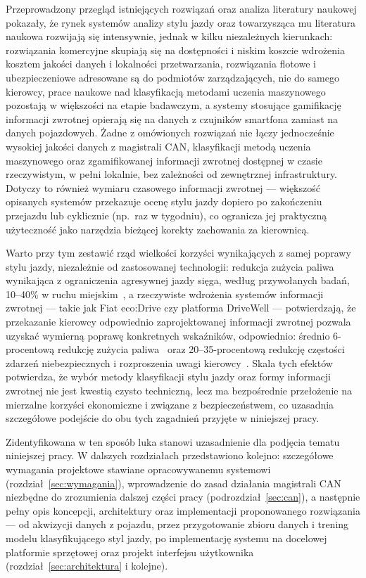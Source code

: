 Przeprowadzony przegląd istniejących rozwiązań oraz analiza literatury naukowej
pokazały, że rynek systemów analizy stylu jazdy oraz towarzysząca mu literatura
naukowa rozwijają się intensywnie,
jednak w kilku niezależnych kierunkach: rozwiązania komercyjne skupiają się na
dostępności i niskim koszcie wdrożenia kosztem jakości danych i lokalności
przetwarzania, rozwiązania flotowe i ubezpieczeniowe adresowane są do podmiotów
zarządzających, nie do samego kierowcy, prace naukowe nad klasyfikacją metodami
uczenia maszynowego pozostają w większości na etapie badawczym, a systemy stosujące
gamifikację informacji zwrotnej opierają się na danych z czujników smartfona zamiast
na danych pojazdowych. Żadne z omówionych rozwiązań nie łączy jednocześnie wysokiej
jakości danych z magistrali CAN, klasyfikacji metodą uczenia maszynowego oraz
zgamifikowanej informacji zwrotnej dostępnej w czasie rzeczywistym, w pełni lokalnie,
bez zależności od zewnętrznej infrastruktury. Dotyczy to również wymiaru czasowego
informacji zwrotnej --- większość opisanych systemów przekazuje ocenę stylu jazdy
dopiero po zakończeniu przejazdu lub cyklicznie (np.\ raz w tygodniu), co ogranicza jej
praktyczną użyteczność jako narzędzia bieżącej korekty zachowania za kierownicą.

Warto przy tym zestawić rząd wielkości korzyści wynikających z samej poprawy stylu
jazdy, niezależnie od zastosowanej technologii: redukcja zużycia paliwa wynikająca
z ograniczenia agresywnej jazdy sięga, według przywołanych badań, 10--40\% w ruchu
miejskim~\cite{thomas2017}, a rzeczywiste wdrożenia systemów informacji zwrotnej ---
takie jak Fiat eco:Drive czy platforma DriveWell --- potwierdzają, że przekazanie
kierowcy odpowiednio zaprojektowanej informacji zwrotnej pozwala uzyskać wymierną
poprawę konkretnych wskaźników, odpowiednio: średnio 6-procentową redukcję zużycia
paliwa~\cite{fiatecodrive} oraz 20--35-procentową redukcję częstości zdarzeń
niebezpiecznych i rozproszenia uwagi kierowcy~\cite{cmtelematics}. Skala tych efektów
potwierdza, że wybór metody klasyfikacji stylu jazdy oraz formy informacji zwrotnej nie
jest kwestią czysto techniczną, lecz ma bezpośrednie przełożenie na mierzalne korzyści
ekonomiczne i związane z bezpieczeństwem, co uzasadnia szczegółowe podejście do obu
tych zagadnień przyjęte w niniejszej pracy.

Zidentyfikowana w ten sposób luka stanowi uzasadnienie dla podjęcia tematu niniejszej
pracy. W dalszych rozdziałach przedstawiono kolejno: szczegółowe wymagania projektowe
stawiane opracowywanemu systemowi (rozdział~\ref{sec:wymagania}), wprowadzenie do
zasad działania magistrali CAN niezbędne do zrozumienia dalszej części pracy
(podrozdział~\ref{sec:can}), a następnie pełny opis koncepcji, architektury oraz
implementacji proponowanego rozwiązania --- od akwizycji danych z pojazdu, przez
przygotowanie zbioru danych i trening modelu klasyfikującego styl jazdy, po
implementację systemu na docelowej platformie sprzętowej oraz projekt interfejsu
użytkownika (rozdział~\ref{sec:architektura} i kolejne).
